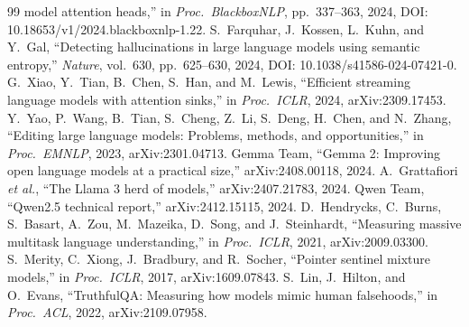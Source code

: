 \documentclass[paper]{ieice}
\begin{document}
\begin{thebibliography}{99}
model attention heads,'' in \emph{Proc.\ BlackboxNLP}, pp.~337--363,
2024, DOI: 10.18653/v1/2024.blackboxnlp-1.22.
 S.~Farquhar, J.~Kossen, L.~Kuhn, and
Y.~Gal, ``Detecting hallucinations in large language models using
semantic entropy,'' \emph{Nature}, vol.~630, pp.~625--630, 2024,
DOI: 10.1038/s41586-024-07421-0.
 G.~Xiao, Y.~Tian, B.~Chen, S.~Han, and M.~Lewis,
``Efficient streaming language models with attention sinks,''
in \emph{Proc.\ ICLR}, 2024, arXiv:2309.17453.
 Y.~Yao, P.~Wang, B.~Tian, S.~Cheng, Z.~Li,
S.~Deng, H.~Chen, and N.~Zhang,
``Editing large language models: Problems, methods, and
opportunities,'' in \emph{Proc.\ EMNLP}, 2023, arXiv:2301.04713.
 Gemma Team, ``Gemma 2: Improving open language models
at a practical size,'' arXiv:2408.00118, 2024.
 A.~Grattafiori \emph{et al.}, ``The Llama 3 herd of
models,'' arXiv:2407.21783, 2024.
 Qwen Team, ``Qwen2.5 technical report,''
arXiv:2412.15115, 2024.
 D.~Hendrycks, C.~Burns, S.~Basart, A.~Zou,
M.~Mazeika, D.~Song, and J.~Steinhardt,
``Measuring massive multitask language understanding,''
in \emph{Proc.\ ICLR}, 2021, arXiv:2009.03300.
 S.~Merity, C.~Xiong, J.~Bradbury, and
R.~Socher, ``Pointer sentinel mixture models,''
in \emph{Proc.\ ICLR}, 2017, arXiv:1609.07843.
 S.~Lin, J.~Hilton, and O.~Evans,
``TruthfulQA: Measuring how models mimic human falsehoods,'' in \emph{Proc.\ ACL}, 2022,
arXiv:2109.07958.

\end{thebibliography}

\end{document}
